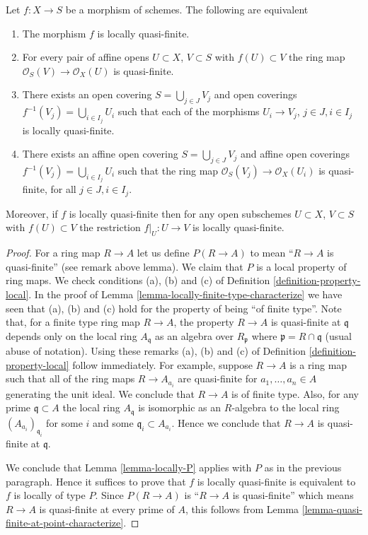 \begin{lemma}
\label{lemma-locally-quasi-finite-characterize}
Let $f : X \to S$ be a morphism of schemes.
The following are equivalent
\begin{enumerate}
\item The morphism $f$ is locally quasi-finite.
\item For every pair of affine opens $U \subset X$, $V \subset S$
with $f(U) \subset V$ the ring map
$\mathcal{O}_S(V) \to \mathcal{O}_X(U)$ is quasi-finite.
\item There exists an open covering $S = \bigcup_{j \in J} V_j$
and open coverings $f^{-1}(V_j) = \bigcup_{i \in I_j} U_i$ such
that each of the morphisms $U_i \to V_j$, $j\in J, i\in I_j$
is locally quasi-finite.
\item There exists an affine open covering $S = \bigcup_{j \in J} V_j$
and affine open coverings $f^{-1}(V_j) = \bigcup_{i \in I_j} U_i$ such
that the ring map $\mathcal{O}_S(V_j) \to \mathcal{O}_X(U_i)$ is
quasi-finite, for all $j\in J, i\in I_j$.
\end{enumerate}
Moreover, if $f$ is locally quasi-finite then for
any open subschemes $U \subset X$, $V \subset S$ with $f(U) \subset V$
the restriction $f|_U : U \to V$ is locally quasi-finite.
\end{lemma}

\begin{proof}
For a ring map $R \to A$ let us define
$P(R \to A)$ to mean ``$R \to A$ is quasi-finite''
(see remark above lemma).
We claim that $P$ is a local property of ring maps.
We check conditions (a), (b) and (c) of Definition
\ref{definition-property-local}. In the proof of
Lemma \ref{lemma-locally-finite-type-characterize}
we have seen that (a), (b) and (c) hold for the property
of being ``of finite type''. Note that, for a finite type ring map
$R \to A$, the property $R \to A$ is quasi-finite at $\mathfrak q$
depends only on the local ring $A_{\mathfrak q}$ as an
algebra over $R_{\mathfrak p}$ where $\mathfrak p = R \cap \mathfrak q$
(usual abuse of notation). Using these remarks (a), (b) and (c) of
Definition \ref{definition-property-local} follow immediately.
For example, suppose $R \to A$ is a ring map
such that all of the ring maps $R \to A_{a_i}$ are quasi-finite
for $a_1, \ldots, a_n \in A$ generating the unit ideal.
We conclude that $R \to A$ is of finite type. Also, for any
prime $\mathfrak q \subset A$ the local ring $A_{\mathfrak q}$
is isomorphic as an $R$-algebra to the local ring
$(A_{a_i})_{\mathfrak q_i}$ for some $i$ and some
$\mathfrak q_i \subset A_{a_i}$. Hence we conclude that
$R \to A$ is quasi-finite at $\mathfrak q$.

\medskip\noindent
We conclude that Lemma \ref{lemma-locally-P} applies with $P$
as in the previous paragraph.
Hence it suffices to prove that $f$ is locally quasi-finite is
equivalent to $f$ is locally of type $P$. Since $P(R \to A)$
is ``$R \to A$ is quasi-finite'' which means $R \to A$ is
quasi-finite at every prime of $A$, this follows from
Lemma \ref{lemma-quasi-finite-at-point-characterize}.
\end{proof}

